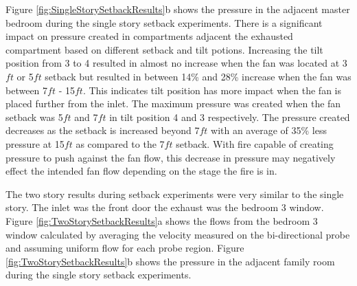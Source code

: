 \documentclass{article}
\begin{document}
Figure \ref{fig:SingleStorySetbackResults}b shows the pressure in the adjacent master bedroom during the single story setback experiments. There is a significant impact on pressure created in compartments adjacent the exhausted compartment based on different setback and tilt potions. Increasing the tilt position from 3 to 4 resulted in almost no increase when the fan was located at 3$ft$ or 5$ft$ setback but resulted in between 14\% and 28\% increase when the fan was between 7$ft$ - 15$ft$. This indicates tilt position has more impact when the fan is placed further from the inlet. The maximum pressure was created when the fan setback was 5$ft$ and 7$ft$ in tilt position 4 and 3 respectively. The pressure created decreases as the setback is increased beyond 7$ft$ with an average of 35\% less pressure at 15$ft$ as compared to the 7$ft$ setback. With fire capable of creating pressure to push against the fan flow, this decrease in pressure may negatively effect the intended fan flow depending on the stage the fire is in. 

The two story results during setback experiments were very similar to the single story. The inlet was the front door the exhaust was the bedroom 3 window. Figure \ref{fig:TwoStorySetbackResults}a shows the flows from the bedroom 3 window calculated by averaging the velocity measured on the bi-directional probe and assuming uniform flow for each probe region. Figure \ref{fig:TwoStorySetbackResults}b shows the pressure in the adjacent family room during the single story setback experiments.
\end{document}

